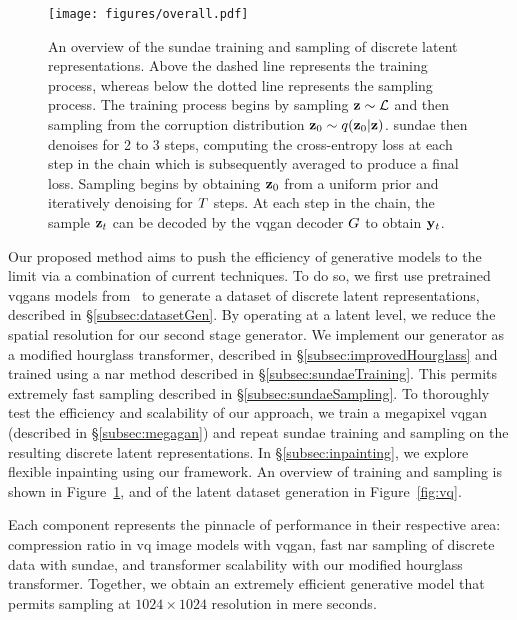 \begin{figure}[ht]
    \centering
    \texttt{[image: figures/overall.pdf]}
    \caption{
        An overview of the \gls{sundae} training and sampling of discrete latent
        representations. Above the dashed line represents the training process,
        whereas below the dotted line represents the sampling process. The
        training process begins by sampling $\mathbf{z} \sim \mathcal{L}$ and
        then sampling from the corruption distribution $\mathbf{z}_0 \sim
        q(\mathbf{z}_0 \vert \mathbf{z})$. \Gls{sundae} then denoises for 2 to 3
        steps, computing the cross-entropy loss at each step in the chain which
        is subsequently averaged to produce a final loss. Sampling begins by
        obtaining $\mathbf{z}_0$ from a uniform prior and iteratively denoising for
        $T$ steps. At each step in the chain, the sample $\mathbf{z}_t$
        can be decoded by the \gls{vqgan} decoder $G$ to obtain
        $\mathbf{y}_t$.
    }
    \label{fig:overall}
\end{figure}

Our proposed method aims to push the efficiency of generative models to the
limit via a combination of current techniques. To do so, we first use pretrained
\glspl{vqgan} models from~\cite{esser2021taming} to generate a dataset of
discrete latent representations, described in \S\ref{subsec:datasetGen}. By
operating at a latent level, we reduce the spatial resolution for our second
stage generator. We implement our generator as a modified hourglass transformer,
described in \S\ref{subsec:improvedHourglass} and trained using a \gls{nar}
method described in \S\ref{subsec:sundaeTraining}. This permits extremely fast
sampling described in \S\ref{subsec:sundaeSampling}. To thoroughly test the
efficiency and scalability of our approach, we train a megapixel \gls{vqgan}
(described in \S\ref{subsec:megagan}) and repeat \gls{sundae} training and
sampling on the resulting discrete latent representations. In
\S\ref{subsec:inpainting}, we explore flexible inpainting using our framework.
An overview of training and sampling is shown in Figure~\ref{fig:overall}, and
of the latent dataset generation in Figure~\ref{fig:vq}.

Each component represents the pinnacle of performance in their respective area:
compression ratio in \gls{vq} image models with \gls{vqgan}, fast \acrlong{nar}
sampling of discrete data with \gls{sundae}, and transformer scalability with
our modified hourglass transformer. Together, we obtain an extremely efficient
generative model that permits sampling at $1024 \times 1024$ resolution in mere
seconds.

